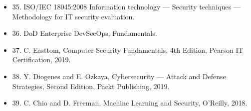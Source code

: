 \begin{itemize}[leftmargin=2em]
\item 35. ISO/IEC 18045:2008 Information technology — Security techniques — Methodology for IT security evaluation.
\item 36. DoD Enterprise DevSecOps, Fundamentals.
\item 37. C. Easttom, Computer Security Fundamentals, 4th Edition, Pearson IT Certification, 2019.
\item 38. Y. Diogenes and E. Ozkaya, Cybersecurity — Attack and Defense Strategies, Second Edition, Packt Publishing, 2019.
\item 39. C. Chio and D. Freeman, Machine Learning and Security, O’Reilly, 2018.
\end{itemize}
